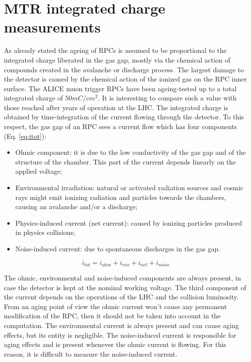 \section{MTR integrated charge measurements}
\label{currents}
As already stated the ageing of RPCs is assumed to be proportional to the integrated charge liberated in the gas gap, mostly via the chemical action of compounds created in the avalanche or discharge process.
The largest damage to the detector is caused by the chemical action of the ionized gas on the RPC inner surface.
The ALICE muon trigger RPCs  have been ageing-tested up to a total integrated charge of $50 mC/cm^2$. 
It is interesting to compare such a value with those reached after years of operation at the LHC.
The integrated charge is obtained by time-integration of the current flowing through the detector. 
To this respect, the gas gap of an RPC sees a current flow which has four components (Eq. \ref{eq:itot}):
\begin{itemize}
\item Ohmic component: it is due to the low conductivity of the gas gap and of the structure of the chamber. This part of the current depends linearly on the applied voltage;
\item Environmental irradiation: natural or activated radiation sources and cosmic rays might emit ionizing radiation and particles towards the chambers, causing an avalanche and/or a discharge;
\item Physics-induced current (net current): caused by ionizing particles produced in physics collisions;
\item Noise-induced current: due to spontaneous discharges in the gas gap.
\end{itemize}

\begin{equation}
\label{eq:itot}
i_{tot}=i_{ohm}+i_{env}+i_{net}+i_{noise}
\end{equation}

The ohmic, environmental and noise-induced components are always present, in case the detector is kept at the nominal working voltage.
The third component of the current depends on the operations of the LHC and the collision luminosity.
From an aging point of view the ohmic current won't cause any permanent modification of the RPC, then it should not be taken into account in the computation.
The environmental current is always present and can cause aging effects, but its entity is negligible.
The noise-induced current is responsible for aging effects and is present whenever the ohmic current is flowing.
For this reason, it is difficult to measure the noise-induced current.

